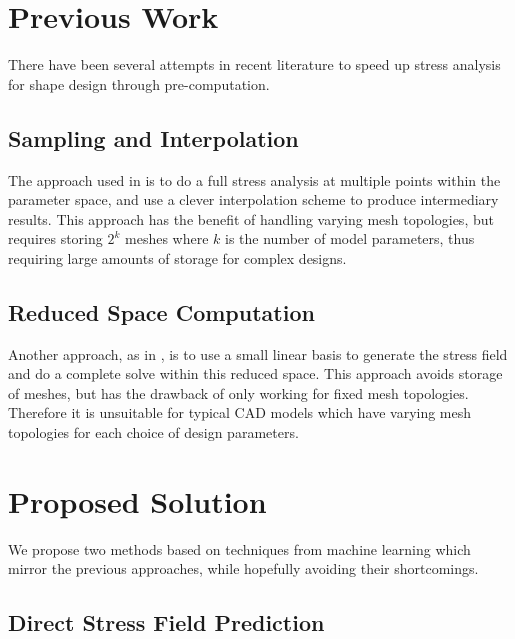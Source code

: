 \documentclass[acmtog, authorversion]{acmart}
\begin{document}

\section{Previous Work}

There have been several attempts in recent literature to speed up stress analysis for shape design through pre-computation.
\subsection{Sampling and Interpolation}

The approach used in \cite{Schulz-17} is to do a full stress analysis at multiple points within the parameter space, and use a clever interpolation scheme to produce intermediary results. This approach has the benefit of handling varying mesh topologies, but requires storing $2^k$ meshes where $k$ is the number of model parameters, thus requiring large amounts of storage for complex designs.



\subsection{Reduced Space Computation}

Another approach, as in \cite{Chen-16}, is to use a small linear basis to generate the stress field and do a complete solve within this reduced space. This approach avoids storage of meshes, but has the drawback of only working for fixed mesh topologies. Therefore it is unsuitable for typical CAD models which have varying mesh topologies for each choice of design parameters.

\section{Proposed Solution}

We propose two methods based on techniques from machine learning which mirror the previous approaches, while hopefully avoiding their shortcomings.

\subsection{Direct Stress Field Prediction}
\end{document}

